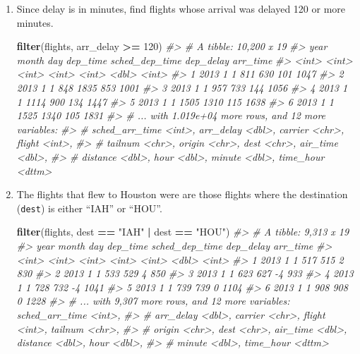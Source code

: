 \documentclass[]{book}
\newenvironment{Shaded}{\begin{snugshade}}{\end{snugshade}}
\newcommand{\CommentTok}[1]{\textcolor[rgb]{0.56,0.35,0.01}{\textit{#1}}}
\newcommand{\DecValTok}[1]{\textcolor[rgb]{0.00,0.00,0.81}{#1}}
\newcommand{\KeywordTok}[1]{\textcolor[rgb]{0.13,0.29,0.53}{\textbf{#1}}}
\newcommand{\NormalTok}[1]{#1}
\newcommand{\OperatorTok}[1]{\textcolor[rgb]{0.81,0.36,0.00}{\textbf{#1}}}
\newcommand{\StringTok}[1]{\textcolor[rgb]{0.31,0.60,0.02}{#1}}
\theoremstyle{plain}
\theoremstyle{remark}
\begin{document}
\begin{enumerate}
\def\labelenumi{\arabic{enumi}.}
\item
  Since delay is in minutes, find flights whose arrival was delayed 120
  or more minutes.

\begin{Shaded}
\begin{Highlighting}[]
\KeywordTok{filter}\NormalTok{(flights, arr_delay }\OperatorTok{>=}\StringTok{ }\DecValTok{120}\NormalTok{)}
\CommentTok{#> # A tibble: 10,200 x 19}
\CommentTok{#>    year month   day dep_time sched_dep_time dep_delay arr_time}
\CommentTok{#>   <int> <int> <int>    <int>          <int>     <dbl>    <int>}
\CommentTok{#> 1  2013     1     1      811            630       101     1047}
\CommentTok{#> 2  2013     1     1      848           1835       853     1001}
\CommentTok{#> 3  2013     1     1      957            733       144     1056}
\CommentTok{#> 4  2013     1     1     1114            900       134     1447}
\CommentTok{#> 5  2013     1     1     1505           1310       115     1638}
\CommentTok{#> 6  2013     1     1     1525           1340       105     1831}
\CommentTok{#> # ... with 1.019e+04 more rows, and 12 more variables:}
\CommentTok{#> #   sched_arr_time <int>, arr_delay <dbl>, carrier <chr>, flight <int>,}
\CommentTok{#> #   tailnum <chr>, origin <chr>, dest <chr>, air_time <dbl>,}
\CommentTok{#> #   distance <dbl>, hour <dbl>, minute <dbl>, time_hour <dttm>}
\end{Highlighting}
\end{Shaded}
\item
  The flights that flew to Houston were are those flights where the
  destination (\texttt{dest}) is either ``IAH'' or ``HOU''.

\begin{Shaded}
\begin{Highlighting}[]
\KeywordTok{filter}\NormalTok{(flights, dest }\OperatorTok{==}\StringTok{ "IAH"} \OperatorTok{|}\StringTok{ }\NormalTok{dest }\OperatorTok{==}\StringTok{ "HOU"}\NormalTok{)}
\CommentTok{#> # A tibble: 9,313 x 19}
\CommentTok{#>    year month   day dep_time sched_dep_time dep_delay arr_time}
\CommentTok{#>   <int> <int> <int>    <int>          <int>     <dbl>    <int>}
\CommentTok{#> 1  2013     1     1      517            515         2      830}
\CommentTok{#> 2  2013     1     1      533            529         4      850}
\CommentTok{#> 3  2013     1     1      623            627        -4      933}
\CommentTok{#> 4  2013     1     1      728            732        -4     1041}
\CommentTok{#> 5  2013     1     1      739            739         0     1104}
\CommentTok{#> 6  2013     1     1      908            908         0     1228}
\CommentTok{#> # ... with 9,307 more rows, and 12 more variables: sched_arr_time <int>,}
\CommentTok{#> #   arr_delay <dbl>, carrier <chr>, flight <int>, tailnum <chr>,}
\CommentTok{#> #   origin <chr>, dest <chr>, air_time <dbl>, distance <dbl>, hour <dbl>,}
\CommentTok{#> #   minute <dbl>, time_hour <dttm>}
\end{Highlighting}
\end{Shaded}


\end{enumerate}
\end{document}
